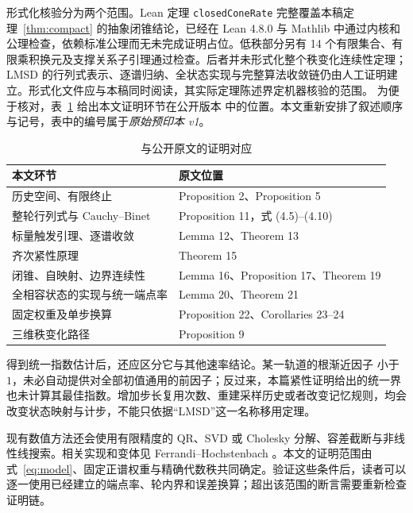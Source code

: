 \documentclass[UTF8,zihao=-4,a4paper]{ctexart}
\theoremstyle{definition}\newtheorem{example}[theorem]{例}
\begin{document}
形式化核验分为两个范围。Lean 定理 \texttt{closedConeRate} 完整覆盖本稿定理~\ref{thm:compact} 的抽象闭锥结论，已经在 Lean 4.8.0 与 Mathlib 中通过内核和公理检查，依赖标准公理而无未完成证明占位。低秩部分另有 14 个有限集合、有限乘积换元及支撑关系子引理通过检查。后者并未形式化整个秩变化连续性定理；LMSD 的行列式表示、逐谱归纳、全状态实现与完整算法收敛链仍由人工证明建立。形式化文件应与本稿同时阅读，其实际定理陈述界定机器核验的范围。
为便于核对，表~\ref{tab:source} 给出本文证明环节在公开版本 \cite{YY2026} 中的位置。本文重新安排了叙述顺序与记号，表中的编号属于\emph{原始预印本 v1}。
\begin{table}[htbp]\centering\small
\caption{与公开原文的证明对应}\label{tab:source}
\begin{tabularx}{\linewidth}{@{}Xl@{}}\toprule
本文环节 & 原文位置\\\midrule
历史空间、有限终止 & Proposition 2、Proposition 5\\
整轮行列式与 Cauchy--Binet & Proposition 11，式 (4.5)--(4.10)\\
标量触发引理、逐谱收敛 & Lemma 12、Theorem 13\\
齐次紧性原理 & Theorem 15\\
闭锥、自映射、边界连续性 & Lemma 16、Proposition 17、Theorem 19\\
全相容状态的实现与统一端点率 & Lemma 20、Theorem 21\\
固定权重及单步换算 & Proposition 22、Corollaries 23--24\\
三维秩变化路径 & Proposition 9\\\bottomrule
\end{tabularx}
\end{table}

得到统一指数估计后，还应区分它与其他速率结论。某一轨道的根渐近因子
 小于 $1$，未必自动提供对全部初值通用的前因子；反过来，本篇紧性证明给出的统一界也未计算其最佳指数。增加步长复用次数、重建采样历史或者改变记忆规则，均会改变状态映射与计步，不能只依据“LMSD”这一名称移用定理。

现有数值方法还会使用有限精度的 QR、SVD 或 Cholesky 分解、容差截断与非线性线搜索。相关实现和变体见 Ferrandi--Hochstenbach \cite{Ferrandi}。本文的证明范围由式~\eqref{eq:model}、固定正谱权重与精确代数秩共同确定。验证这些条件后，读者可以逐一使用已经建立的端点率、轮内界和误差换算；超出该范围的断言需要重新检查证明链。
\end{document}
